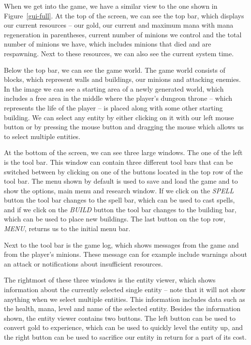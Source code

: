 When we get into the game, we have a similar view to the one shown in Figure~\ref{gui-full}. At the top of the screen, we can see the top
bar, which displays our current resources -- our gold, our current and maximum mana with mana regeneration in parentheses, current number
of minions we control and the total number of minions we have, which includes minions that died and are respawning. Next to these resources,
we can also see the current system time.

Below the top bar, we can see the game world. The game world consists of blocks, which represent walls and buildings, our minions and
attacking enemies. In the image we can see a starting area of a newly generated world, which includes a free area in the middle where
the player's dungeon throne -- which represents the life of the player -- is placed along with some other starting building. We can select
any entity by either clicking on it with our left mouse button or by pressing the mouse button and dragging the mouse which allows us
to select multiple entities.

At the bottom of the screen, we can see three large windows. The one of the left is the tool bar. This window can contain three different
tool bars that can be switched between by clicking on one of the buttons located in the top row of the tool bar. The menu shown by default
is used to save and load the game and to show the options, main menu and research window. If we click on the \emph{SPELL} button the tool bar
changes to the spell bar, which can be used to cast spells, and if we click on the \emph{BUILD} button the tool bar changes to the building
bar, which can be used to place new buildings. The last button on the top row, \emph{MENU}, returns us to the initial menu bar.

Next to the tool bar is the game log, which shows messages from the game and from the player's minions. These message can for example include
warnings about an attack or notifications about insufficient resources.

The rightmost of these three windows is the entity viewer, which shows information about the currently selected single entity -- note that
it will not show anything when we select multiple entities. This information includes data such as the health, mana, level and name of the
selected entity. Besides the information shown, the entity viewer contains two buttons. The left button can be used to convert gold to
experience, which can be used to quickly level the entity up, and the right button can be used to sacrifice our entity in return for a part
of its cost.

